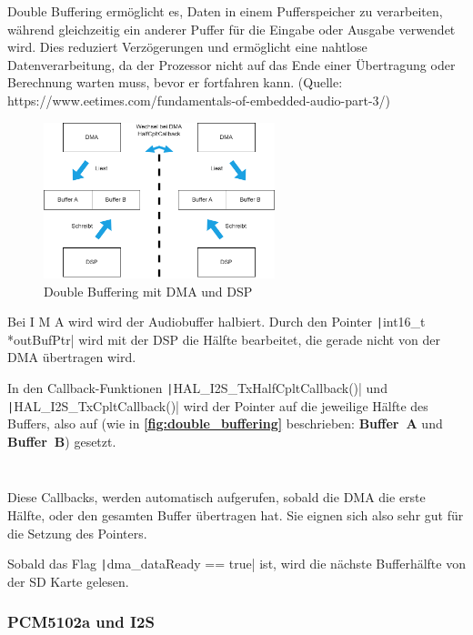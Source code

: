 Double Buffering ermöglicht es, Daten in einem Pufferspeicher zu verarbeiten, während gleichzeitig ein anderer Puffer für die Eingabe oder Ausgabe verwendet wird. Dies reduziert Verzögerungen und ermöglicht eine nahtlose Datenverarbeitung, da der Prozessor nicht auf das Ende einer Übertragung oder Berechnung warten muss, bevor er fortfahren kann. (Quelle: https://www.eetimes.com/fundamentals-of-embedded-audio-part-3/)

\begin{figure}[H]
	\centering
	\includegraphics[width=0.6\textwidth]{images/08_durchfuehrung/audio/double_buffering.drawio.png}
	\caption{Double Buffering mit DMA und DSP}
	\label{fig:double_buffering}
\end{figure}


Bei I M A wird wird der Audiobuffer halbiert. 
Durch den Pointer \texttt|int16_t *outBufPtr| wird mit der DSP die Hälfte bearbeitet, die gerade nicht von der DMA übertragen wird.

In den Callback-Funktionen \texttt|HAL_I2S_TxHalfCpltCallback()| und \texttt|HAL_I2S_TxCpltCallback()| wird der Pointer auf die jeweilige Hälfte des Buffers, also auf (wie in  \textbf{\autoref{fig:double_buffering}} beschrieben:
\textbf{Buffer~A} und \textbf{Buffer~B}) gesetzt.


\inputminted[firstline=28, lastline=31]{c}{../../f401_sd_card_audio_codec_test/Core/Src/audio.c}

\inputminted[firstline=40, lastline=43]{c}{../../f401_sd_card_audio_codec_test/Core/Src/audio.c}


Diese Callbacks, werden automatisch aufgerufen, sobald die DMA die erste Hälfte, oder den gesamten Buffer übertragen hat. Sie eignen sich also sehr gut für die Setzung des Pointers.

Sobald das Flag \texttt|dma_dataReady == true| ist, wird die nächste Bufferhälfte von der SD Karte gelesen. 

\subsubsection{PCM5102a und I2S}

